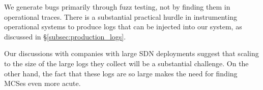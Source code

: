 We generate bugs primarily through fuzz testing, not by finding them in
operational traces. There is a substantial practical hurdle in instrumenting
operational systems to produce logs that can be injected into our system, as
discussed in \S\ref{subsec:production_logs}.

Our discussions with companies with large SDN deployments suggest that scaling to the size of the
large logs they collect will be a substantial challenge.
On the other hand, the fact that these logs are so large makes the need for finding MCSes even more acute.


